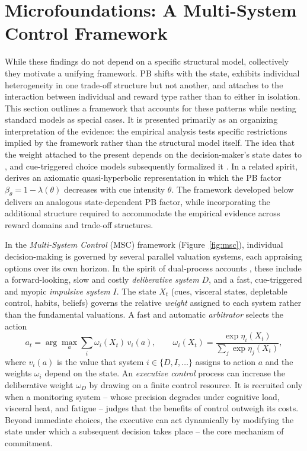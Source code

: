 \documentclass[11pt,a4paper]{article}
\theoremstyle{plain}
\theoremstyle{definition}
\begin{document}
\section{Microfoundations: A Multi-System Control Framework}
\label{sec:model}


While these findings do not depend on a specific structural model, collectively they motivate a unifying framework. 
PB shifts with the state, exhibits individual heterogeneity in one trade-off structure but not another, and attaches to the interaction between individual and reward type rather than to either in isolation.
This section outlines a framework that accounts for these patterns while nesting standard models as special cases. 
It is presented primarily as an organizing interpretation of the evidence: the empirical analysis tests specific restrictions implied by the framework rather than the structural model itself.
The idea that the weight attached to the present depends on the decision-maker's state dates to \citet{loewenstein1996}, and cue-triggered choice models subsequently formalized it \citep{laibson2001,bernheimrangel2004,loewensteinodonoghue2005}. 
In a related spirit, \citet{pennesi2020} derives an axiomatic quasi-hyperbolic representation in which the PB factor $\beta_\theta = 1 - \lambda(\theta)$ decreases with cue intensity $\theta$. 
The framework developed below delivers an analogous state-dependent PB factor, while incorporating the additional structure required to accommodate the empirical evidence across reward domains and trade-off structures.

In the \emph{Multi-System Control} (MSC) framework (Figure~\ref{fig:msc}), individual decision-making is governed by several parallel valuation systems, each appraising options over its own horizon.
 In the spirit of dual-process accounts \citep[e.g.,][]{thalershefrin1981,loewensteinodonoghue2005,kahneman2003},  %
these include a forward-looking, slow and costly \textit{deliberative system} $D$, and a fast, cue-triggered and myopic \textit{impulsive system} $I$.
The state $X_t$ (cues, visceral states, depletable control, habits, beliefs) governs the relative \textit{weight} assigned to each system rather than the fundamental valuations.
A fast and automatic \textit{arbitrator} selects the action
\[
a_t=\arg\max_a \sum_i \omega_i(X_t)\, v_i(a), \qquad \omega_i(X_t)=\frac{\exp \eta_i(X_t)}{\sum_j \exp \eta_j(X_t)},
\]
where $v_i(a)$ is the value that system $i \in \{D, I, \dots\}$ assigns to action $a$ and the weights $\omega_i$ depend on the state.
An \textit{executive control} process can increase the deliberative weight $\omega_D$ by drawing on a finite control resource. It is recruited only when a monitoring system -- whose precision degrades under cognitive load, visceral heat, and fatigue -- judges that the benefits of control outweigh its costs.
Beyond immediate choices, the executive can act dynamically by modifying the state under which a subsequent decision takes place -- the core mechanism of commitment.
\end{document}
